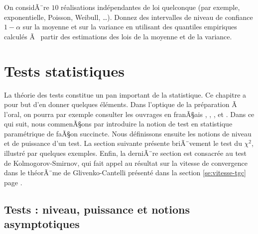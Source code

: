 \begin{exo}
  On considÃ¨re $10$ réalisations indépendantes de loi quelconque (par exemple,
  exponentielle, Poisson, Weibull, \ldots). Donnez des intervalles de niveau
  de confiance $1-\alpha$ sur la moyenne et sur la variance en utilisant des
  quantiles empiriques calculés Ã  partir des estimations des lois de la
  moyenne et de la variance.
\end{exo}

%
\section{Tests statistiques}\label{se:tests}
%


La théorie des tests constitue un pan important de la statistique. Ce chapitre
a pour but d'en donner quelques éléments. Dans l'optique de la préparation Ã 
l'oral, on pourra par exemple consulter les ouvrages en franÃ§ais \cite{vokac},
\cite{dacunha-castelle-duflo}, \cite{paul-toulouse}, \cite{saporta} et
\cite{tomassone}. Dans ce qui suit, nous commenÃ§ons par introduire la notion
de test en statistique paramétrique de faÃ§on succincte. Nous définissons
ensuite les notions de niveau et de puissance d'un test. La section suivante
présente briÃ¨vement le test du $\chi^2$, illustré par quelques exemples.
Enfin, la derniÃ¨re section est consacrée au test de Kolmogorov-Smirnov, qui
fait appel au résultat sur la vitesse de convergence dans le théorÃ¨me de
Glivenko-Cantelli présenté dans la section \ref{se:vitesse-tgc} page
\pageref{se:vitesse-tgc}.

%
\subsection{Tests : niveau, puissance et notions asymptotiques}
%

